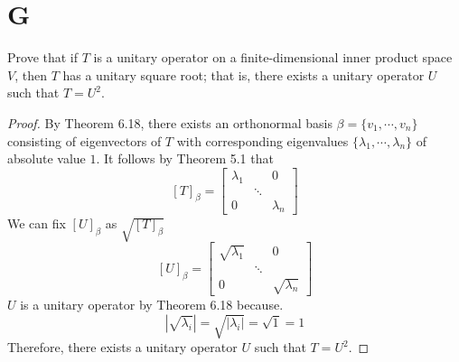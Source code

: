 \documentclass[11pt]{scrartcl}
\begin{document}
\section{G}
Prove that if $T$ is a unitary operator on a finite-dimensional inner product space $V$, then $T$ has a unitary square
root; that is, there exists a unitary operator $U$ such that $T = U^2$.
\begin{proof}
	By Theorem 6.18, there exists an orthonormal basis $\beta = \{v_1, \cdots, v_n\}$ consisting of eigenvectors of $T$
	with corresponding eigenvalues $\{\lambda_1, \cdots, \lambda_n\}$ of absolute value $1$.
	It follows by Theorem 5.1 that
	$$
		[T]_\beta =
		\begin{bmatrix}
			\lambda_{1} &        & 0           \\
			            & \ddots &             \\
			0           &        & \lambda_{n}
		\end{bmatrix}
	$$
	We can fix $[U]_\beta$ as $\sqrt{[T]_\beta}$
	$$
		[U]_\beta =
		\begin{bmatrix}
			\sqrt{\lambda_{1}} &        & 0                  \\
			                   & \ddots &                    \\
			0                  &        & \sqrt{\lambda_{n}}
		\end{bmatrix}
	$$
	$U$ is a unitary operator by Theorem 6.18 because.
	$$|\sqrt{\lambda_{i}}| = \sqrt{|\lambda_{i}|} = \sqrt{1} = 1$$
	Therefore, there exists a unitary operator $U$ such that $T = U^2$.
\end{proof}

\end{document}
